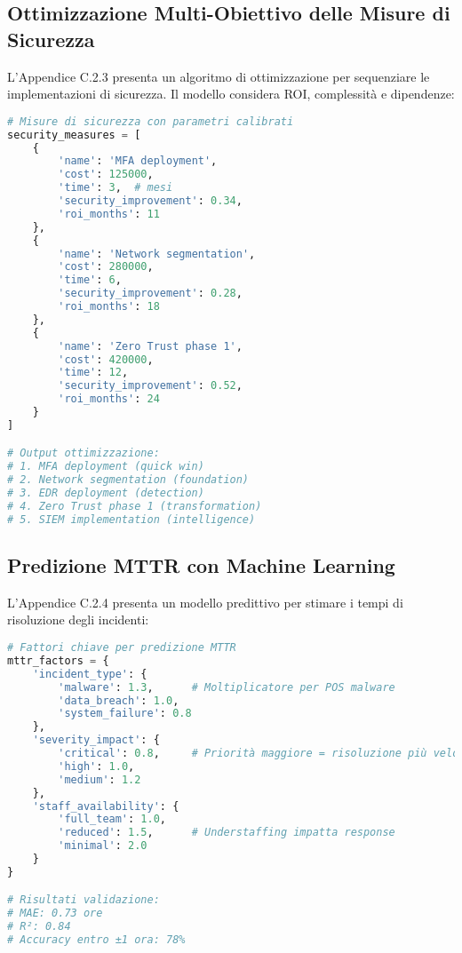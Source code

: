 \subsection{Ottimizzazione Multi-Obiettivo delle Misure di Sicurezza}

L'Appendice C.2.3 presenta un algoritmo di ottimizzazione per sequenziare le implementazioni di sicurezza. Il modello considera ROI, complessità e dipendenze:

\begin{lstlisting}[language=Python, caption=Framework di ottimizzazione security ROI]
# Misure di sicurezza con parametri calibrati
security_measures = [
    {
        'name': 'MFA deployment',
        'cost': 125000,
        'time': 3,  # mesi
        'security_improvement': 0.34,
        'roi_months': 11
    },
    {
        'name': 'Network segmentation',
        'cost': 280000,
        'time': 6,
        'security_improvement': 0.28,
        'roi_months': 18
    },
    {
        'name': 'Zero Trust phase 1',
        'cost': 420000,
        'time': 12,
        'security_improvement': 0.52,
        'roi_months': 24
    }
]

# Output ottimizzazione:
# 1. MFA deployment (quick win)
# 2. Network segmentation (foundation)
# 3. EDR deployment (detection)
# 4. Zero Trust phase 1 (transformation)
# 5. SIEM implementation (intelligence)
\end{lstlisting}

\subsection{Predizione MTTR con Machine Learning}

L'Appendice C.2.4 presenta un modello predittivo per stimare i tempi di risoluzione degli incidenti:

\begin{lstlisting}[language=Python, caption=Predizione MTTR per incident response]
# Fattori chiave per predizione MTTR
mttr_factors = {
    'incident_type': {
        'malware': 1.3,      # Moltiplicatore per POS malware
        'data_breach': 1.0,
        'system_failure': 0.8
    },
    'severity_impact': {
        'critical': 0.8,     # Priorità maggiore = risoluzione più veloce
        'high': 1.0,
        'medium': 1.2
    },
    'staff_availability': {
        'full_team': 1.0,
        'reduced': 1.5,      # Understaffing impatta response
        'minimal': 2.0
    }
}

# Risultati validazione:
# MAE: 0.73 ore
# R²: 0.84
# Accuracy entro ±1 ora: 78%
\end{lstlisting}

